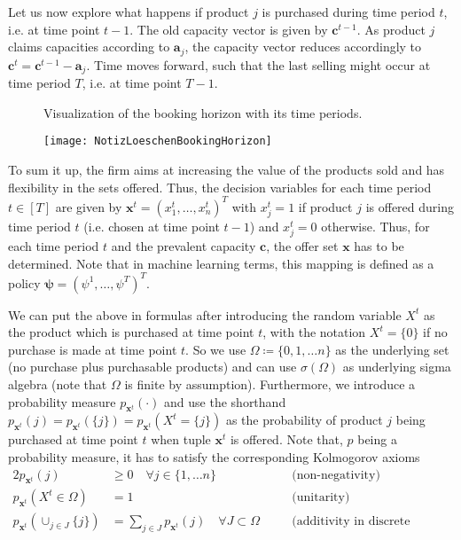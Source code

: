Let us now explore what happens if product $j$ is purchased during time period $t$, i.e. at time point $t-1$. The old capacity vector is given by $\boldsymbol{c}^{t-1}$. As product $j$ claims capacities according to $\boldsymbol{a}_j$,  the capacity vector reduces accordingly to $\boldsymbol{c}^{t} = \boldsymbol{c}^{t-1} - \boldsymbol{a}_j$. Time moves forward, such that the last selling might occur at time period $T$, i.e. at time point $T-1$.

\begin{figure}
	\centering
	\caption{Visualization of the booking horizon with its time periods.\label{fig:Prob:Horizon}}
	\texttt{[image: NotizLoeschenBookingHorizon]}
	\caption{}
	\label{fig:notizloeschenbookinghorizon}
\end{figure}



To sum it up, the firm aims at increasing the value of the products sold and has flexibility in the sets offered. Thus, the decision variables for each time period $t \in [T]$ are given by $\boldsymbol{x}^t = (x^t_1, \dots, x^t_n)^T$ with $x^t_j = 1$ if product $j$ is offered during time period $t$ (i.e. chosen at time point $t-1$) and $x^t_j = 0$ otherwise. Thus, for each time period $t$ and the prevalent capacity $\boldsymbol{c}$, the offer set $\boldsymbol{x}$ has to be determined. Note that in machine learning terms, this mapping is defined as a policy $\boldsymbol{\psi} = (\psi^1, \dots, \psi^T)^T$.

We can put the above in formulas after introducing the random variable $X^t$ as the product which is purchased at time point $t$, with the notation $X^t=\{0\}$ if no purchase is made at time point $t$. 
So we use $\Omega \coloneqq \{0, 1, \dots n\}$ as the underlying set (no purchase plus purchasable products) and can use $\sigma(\Omega)$ as underlying sigma algebra (note that $\Omega$ is finite by assumption). 
Furthermore, we introduce a probability measure $p_{\boldsymbol{x}^t}(\cdot)$ 
and use the shorthand $p_{\boldsymbol{x}^t}(j) = p_{\boldsymbol{x}^t}(\{j\}) = p_{\boldsymbol{x}^t}(X^t = \{j\})$ as the probability of product $j$ being purchased at time point $t$ when tuple $\boldsymbol{x}^t$ is offered. Note that, $p$ being a probability measure, it has to satisfy the corresponding Kolmogorov axioms 
\begin{alignat}{2}
p_{\boldsymbol{x}^t}(j) &\geq 0 \quad \forall j \in \{1, \dots n\} \quad &&\text{(non-negativity)}\\
p_{\boldsymbol{x}^t}(X^t \in \Omega) &= 1 &&\text{(unitarity)}\\
p_{\boldsymbol{x}^t}(\cup_{j \in J}\{j\}) &= \sum_{j \in J}p_{\boldsymbol{x}^t}(j) \quad \forall J \subset \Omega \quad &&\text{(additivity in discrete setting)}
\end{alignat}

